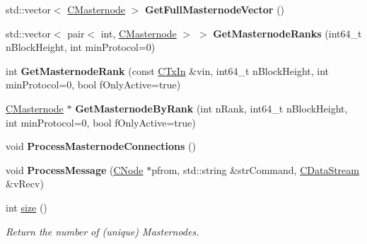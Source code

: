 \begin{DoxyCompactItemize}
\mbox{\label{class_c_masternode_man_ab39e213a7601e1bef2eba1d5d63206f5}} 
std\+::vector$<$ \mbox{\hyperlink{class_c_masternode}{C\+Masternode}} $>$ {\bfseries Get\+Full\+Masternode\+Vector} ()
\item 
\mbox{\label{class_c_masternode_man_ac06180b4570d5d1b098979c2f59a7a90}} 
std\+::vector$<$ pair$<$ int, \mbox{\hyperlink{class_c_masternode}{C\+Masternode}} $>$ $>$ {\bfseries Get\+Masternode\+Ranks} (int64\+\_\+t n\+Block\+Height, int min\+Protocol=0)
\item 
\mbox{\label{class_c_masternode_man_a41fd522da90284837d5dcb1e2d2e7d7c}} 
int {\bfseries Get\+Masternode\+Rank} (const \mbox{\hyperlink{class_c_tx_in}{C\+Tx\+In}} \&vin, int64\+\_\+t n\+Block\+Height, int min\+Protocol=0, bool f\+Only\+Active=true)
\item 
\mbox{\label{class_c_masternode_man_ab32afaad2651c69d2f93c68aee466677}} 
\mbox{\hyperlink{class_c_masternode}{C\+Masternode}} $\ast$ {\bfseries Get\+Masternode\+By\+Rank} (int n\+Rank, int64\+\_\+t n\+Block\+Height, int min\+Protocol=0, bool f\+Only\+Active=true)
\item 
\mbox{\label{class_c_masternode_man_ad8a9994f53e2d6385b8caba4cd5ee4b9}} 
void {\bfseries Process\+Masternode\+Connections} ()
\item 
\mbox{\label{class_c_masternode_man_ae3e5d263cebdcd932eca49caeadce9aa}} 
void {\bfseries Process\+Message} (\mbox{\hyperlink{class_c_node}{C\+Node}} $\ast$pfrom, std\+::string \&str\+Command, \mbox{\hyperlink{class_c_data_stream}{C\+Data\+Stream}} \&v\+Recv)
\item 
\mbox{\label{class_c_masternode_man_a794ebfab7b09b51619a14d07306d817e}} 
int \mbox{\hyperlink{class_c_masternode_man_a794ebfab7b09b51619a14d07306d817e}{size}} ()
\begin{DoxyCompactList}\small\item\em Return the number of (unique) Masternodes. \end{DoxyCompactList}\item 
\mbox{\label{class_c_masternode_man_a35baa3dcb49d2a8e38376747b7b44c59}} 

\end{DoxyCompactItemize}
